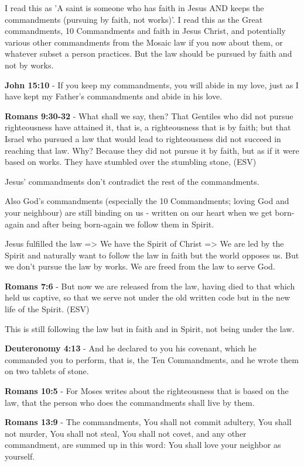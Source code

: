 \documentclass[11pt]{article}
\begin{document}
I read this as 'A saint is someone who has faith in Jesus AND keeps the commandments (pursuing by faith, not works)'.
I read this as the Great commandments, 10 Commandments and faith in Jesus Christ, and potentially various other commandments from the Mosaic law if you now about them, or whatever subset a person practices.
But the law should be pursued by faith and not by works.

\textbf{John 15:10} - If you keep my commandments, you will abide in my love, just as I have kept my Father's commandments and abide in his love.

\textbf{Romans 9:30-32} - What shall we say, then? That Gentiles who did not pursue righteousness have attained it, that is, a righteousness that is by faith; but that Israel who pursued a law that would lead to righteousness did not succeed in reaching that law. Why? Because they did not pursue it by faith, but as if it were based on works. They have stumbled over the stumbling stone, (ESV)

Jesus' commandments don't contradict the rest of the commandments.

Also God's commandments (especially the 10 Commandments; loving God and your neighbour) are still binding on us - written on our heart when we get born-again and after being born-again we follow them in Spirit.

Jesus fulfilled the law => We have the Spirit of Christ => We are led by the Spirit and naturally want to follow the law in faith but the world opposes us.
But we don't pursue the law by works. We are freed from the law to serve God.

\textbf{Romans 7:6} -  But now we are released from the law, having died to that which held us captive, so that we serve not under the old written code but in the new life of the Spirit.  (ESV)

This is still following the law but in faith and in Spirit, not being under the law.

\textbf{Deuteronomy 4:13} - And he declared to you his covenant, which he commanded you to perform, that is, the Ten Commandments, and he wrote them on two tablets of stone.

\textbf{Romans 10:5} - For Moses writes about the righteousness that is based on the law, that the person who does the commandments shall live by them.

\textbf{Romans 13:9} - The commandments, You shall not commit adultery, You shall not murder, You shall not steal, You shall not covet, and any other commandment, are summed up in this word: You shall love your neighbor as yourself.
\end{document}
